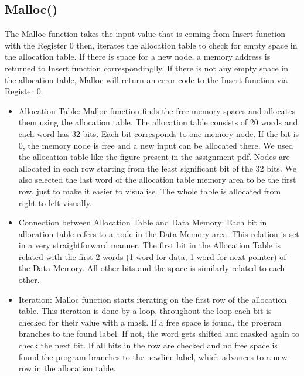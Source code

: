 \documentclass[pdftex,12pt,a4paper]{article}
\begin{document}
\subsection{Malloc()}
The Malloc function takes the input value that is coming from Insert function with  the  Register 0  then,  iterates  the allocation table to check for empty space in the allocation table. If there is space for a new node, a memory address is returned to Insert function correspondinglly. If there is not any empty space in the allocation table, Malloc will return an error code to the Insert function via Register 0.
\begin{itemize}
    \item Allocation Table: Malloc function finds the free memory spaces and allocates them using the allocation table.
The allocation table consists of 20 words and each word has 32 bits. Each bit corresponds to one memory node. If the bit is 0, the memory node is free and a new input can be allocated there. We used the allocation table like the figure present in the assignment pdf. Nodes are allocated in each row starting from the least significant bit of the 32 bits. We also selected the last word of the allocation table memory area to be the first row, just to make it easier to visualise. The whole table is allocated from right to left visually.
\item Connection between Allocation Table and Data Memory: Each bit in allocation table refers to a node in the Data Memory area. This relation is set in a very straightforward manner. The first bit in the Allocation Table is related with the first 2 words (1 word for data, 1 word for next pointer) of the Data Memory. All other bits and the space is similarly related to each other.
\item Iteration: Malloc function starts iterating on the first row of the allocation table. This iteration is done by a loop, throughout the loop each bit is checked for their value with a mask. If a free space is found, the program branches to the found label. If not, the word gets shifted and masked again to check the next bit. If all bits in the row are checked and no free space is found the program branches to the newline label, which advances to a new row in the allocation table.


\end{itemize}
\end{document}
